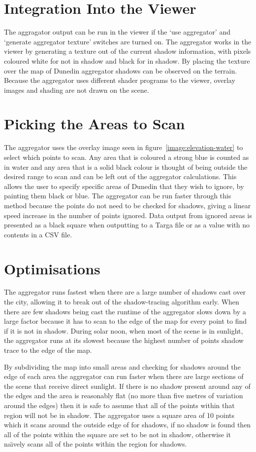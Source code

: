 \documentclass[12pt]{report}
\begin{document}
\section{Integration Into the Viewer}
The aggragator output can be run in the viewer if the `use aggregator' and `generate aggregator texture' switches are turned on. The aggregator works in the viewer by generating a texture out of the current shadow information, with pixels coloured white for not in shadow and black for in shadow. By placing the texture over the map of Dunedin aggregator shadows can be observed on the terrain. Because the aggregator uses different shader programs to the viewer, overlay images and shading are not drawn on the scene.

\section{Picking the Areas to Scan}
The aggregator uses the overlay image seen in figure~\ref{image:elevation-water} to select which points to scan. Any area that is coloured a strong blue is counted as in water and any area that is a solid black colour is thought of being outside the desired range to scan and can be left out of the aggregator calculations. This allows the user to specify specific areas of Dunedin that they wish to ignore, by painting them black or blue. The aggregator can be run faster through this method because the points do not need to be checked for shadows, giving a linear speed increase in the number of points ignored. Data output from ignored areas is presented as a black square when outputting to a Targa file or as a value with no contents in a CSV file.

\section{Optimisations}
The aggregator runs fastest when there are a large number of shadows cast over the city, allowing it to break out of the shadow-tracing algorithm early. When there are few shadows being cast the runtime of the aggregator slows down by a large factor because it has to scan to the edge of the map for every point to find if it is not in shadow. During solar noon, when most of the scene is in sunlight, the aggregator runs at its slowest because the highest number of points shadow trace to the edge of the map.

By subdividing the map into small areas and checking for shadows around the edge of each area the aggregator can run faster when there are large sections of the scene that receive direct sunlight. If there is no shadow present around any of the edges and the area is reasonably flat (no more than five metres of variation around the edges) then it is safe to assume that all of the points within that region will not be in shadow. The aggregator uses a square area of 10 points which it scans around the outside edge of for shadows, if no shadow is found then all of the points within the square are set to be not in shadow, otherwise it na\"{\i}vely scans all of the points within the region for shadows.
\end{document}
